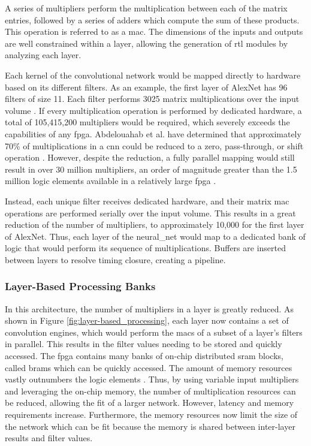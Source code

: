 \documentclass{uw-ece-wkrpt}
\begin{document}
A series of multipliers perform the multiplication between each of the matrix entries, followed by a series of adders which compute the sum of these products. This operation is referred to as a \gls{mac}. The dimensions of the inputs and outputs are well constrained within a layer, allowing the generation of \gls{rtl} modules by analyzing each layer.

Each \gls{kernel} of the convolutional network would be mapped directly to hardware based on its different \glspl{filter}. As an example, the first layer of AlexNet has 96 \glspl{filter} of size 11. Each \gls{filter} performs 3025 matrix multiplications over the input volume \cite{Krizhevsky2017ImageNet-Classi}. If every multiplication operation is performed by dedicated hardware, a total of 105,415,200 multipliers would be required, which severely exceeds the capabilities of any \gls{fpga}. Abdelouahab et al. have determined that approximately 70\% of multiplications in a \gls{cnn} could be reduced to a zero, pass-through, or shift operation \cite{Abdelouahab2017Hardware-Automa}. However, despite the reduction, a fully parallel mapping would still result in over 30 million multipliers, an order of magnitude greater than the 1.5 million logic elements available in a relatively large \gls{fpga} \cite{Intel-Corp.2018IntelR-ArriaR-1}.

Instead, each unique \gls{filter} receives dedicated hardware, and their matrix \gls{mac} operations are performed serially over the input volume. This results in a great reduction of the number of multipliers, to approximately 10,000 for the first layer of AlexNet. Thus, each layer of the \gls{neural_net} would map to a dedicated bank of logic that would perform its sequence of multiplications. Buffers are inserted between layers to resolve timing closure, creating a pipeline.

\subsubsection{Layer-Based Processing Banks}

In this architecture, the number of multipliers in a layer is greatly reduced. As shown in Figure \ref{fig:layer-based_processing}, each layer now contains a set of convolution engines, which would perform the \glspl{mac} of a subset of a layer's \glspl{filter} in parallel. This results in the \gls{filter} values needing to be stored and quickly accessed. The \gls{fpga} contains many banks of on-chip distributed \gls{sram} blocks, called \glspl{bram} which can be quickly accessed. The amount of memory resources vastly outnumbers the logic elements \cite{Intel-Corp.2018IntelR-ArriaR-1}. Thus, by using variable input multipliers and leveraging the on-chip memory, the number of multiplication resources can be reduced, allowing the fit of a larger network. However, latency and memory requirements increase. Furthermore, the memory resources now limit the size of the network which can be fit because the memory is shared between inter-layer results and \gls{filter} values.
\end{document}
